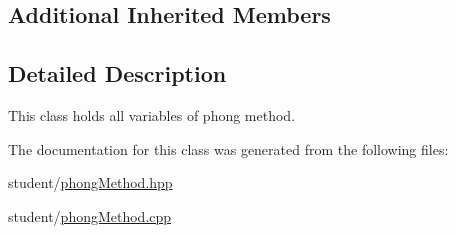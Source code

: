 \subsection*{Additional Inherited Members}


\subsection{Detailed Description}
This class holds all variables of phong method. 

The documentation for this class was generated from the following files\+:\begin{DoxyCompactItemize}
\item 
student/\hyperlink{phongMethod_8hpp}{phong\+Method.\+hpp}\item 
student/\hyperlink{phongMethod_8cpp}{phong\+Method.\+cpp}\end{DoxyCompactItemize}
